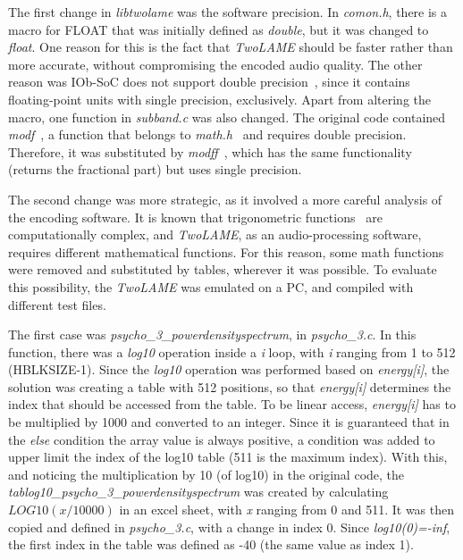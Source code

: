 The first change in \textit{libtwolame} was the software precision. In \textit{comon.h}, there is a macro for FLOAT that was initially defined as \textit{double}, but it was changed to \textit{float}. One reason for this is the fact that \textit{TwoLAME} should be faster rather than more accurate, without compromising the encoded audio quality. The other reason was IOb-SoC does not support double precision~\cite{doubleprecision}, since it contains floating-point units with single precision, exclusively. Apart from altering the macro, one function in \textit{subband.c} was also changed. The original code contained \textit{modf}~\cite{modf}, a function that belongs to \textit{math.h}~\cite{mathh} and requires double precision. Therefore, it was substituted by \textit{modff}~\cite{modf}, which has the same functionality (returns the fractional part) but uses single precision.

The second change was more strategic, as it involved a more careful analysis of the encoding software. It is known that trigonometric functions~\cite{trigonometric} are computationally complex, and \textit{TwoLAME}, as an audio-processing software, requires different mathematical functions. For this reason, some math functions were removed and substituted by tables, wherever it was possible. To evaluate this possibility, the \textit{TwoLAME} was emulated on a PC, and compiled with different test files.

The first case was \textit{psycho\_3\_powerdensityspectrum}, in \textit{psycho\_3.c}. In this function, there was a \textit{log10} operation inside a \textit{i} loop, with \textit{i} ranging from 1 to 512 (HBLKSIZE-1). Since the \textit{log10} operation was performed based on \textit{energy[i]}, the solution was creating a table with 512 positions, so that \textit{energy[i]} determines the index that should be accessed from the table. To be linear access, \textit{energy[i]} has to be multiplied by 1000 and converted to an integer. Since it is guaranteed that in the \textit{else} condition the array value is always positive, a condition was added to upper limit the index of the log10 table (511 is the maximum index). With this, and noticing the multiplication by 10 (of log10) in the original code, the \textit{tablog10\_psycho\_3\_powerdensityspectrum} was created by calculating $LOG10(x/10000)$ in an excel sheet, with \textit{x} ranging from 0 and 511. It was then copied and defined in \textit{psycho\_3.c}, with a change in index 0. Since \textit{log10(0)=-inf}, the first index in the table was defined as -40 (the same value as index 1).

